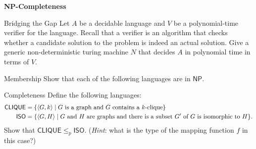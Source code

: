 \documentclass[11pt]{book}
\newcommand{\doctitle}{NP-Completeness}
\begin{document}
\begin{center}
  \large\textbf{{\doctitle}}
\end{center}

\vspace{2em}


\newcommand{\desc}[1]{\ensuremath{\langle #1 \rangle}}
\newcommand{\NP}{\ensuremath{\mathsf{NP}}\xspace}
\newcommand{\lang}[1]{\ensuremath{\mathsf{#1}}\xspace}


\begin{problem}{Bridging the Gap}
  Let \( A \) be a decidable language and \( V \) be a polynomial-time verifier for the language.
  Recall that a verifier is an algorithm that checks whether a candidate solution to the problem is indeed an actual solution.
  Give a generic non-deterministic turing machine \( N \) that decides \( A \) in polynomial time in terms of \( V \).
\end{problem}

\vspace{2.5in}

\begin{problem}{Membership}
  Show that each of the following languages are in \NP.
\end{problem}

\newpage

\begin{problem}{Completeness}
  Define the following languages:
  \begin{align*}
    \lang{CLIQUE} =&\; \{ \desc{G, k} \mid \text{\( G \) is a graph and \( G \) contains a \( k \)-clique} \} \\
    \lang{ISO}    =&\; \{ \desc{G, H} \mid \text{\( G \) and \( H \) are graphs and there is a subset \( G' \) of \( G \) is isomorphic to \( H \)} \}.
  \end{align*}
  Show that \( \lang{CLIQUE} \leq_p \lang{ISO} \).
  (\emph{Hint}: what is the type of the mapping function \( f \) in this case?)
\end{problem}
\end{document}
